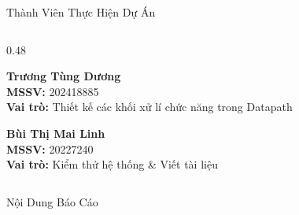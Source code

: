 \documentclass[10pt, aspectratio=169]{beamer}
\begin{document}
\begin{frame}{Thành Viên Thực Hiện Dự Án}
\begin{columns}[T]
    \begin{column}{0.48\textwidth}
      \centering
      \begin{minipage}{\textwidth}
        \centering
        \colorbox{DeepBlue!5}{
          \begin{minipage}[t][2.2cm][c]{0.95\textwidth}
            \centering
            \vspace{0.15cm}
            {\large\bfseries\color{DeepBlue} Trương Tùng Dương} \\
            \vspace{0.15cm}
            \scriptsize
            \textbf{MSSV:} 202418885 \\
            \textbf{Vai trò:} Thiết kế các khối xử lí chức năng trong Datapath
          \end{minipage}
        }
      \end{minipage}

      \vspace{0.5cm}

      \begin{minipage}{\textwidth}
        \centering
        \colorbox{DeepBlue!5}{
          \begin{minipage}[t][2.2cm][c]{0.95\textwidth}
            \centering
            \vspace{0.15cm}
            {\large\bfseries\color{DeepBlue} Bùi Thị Mai Linh} \\
            \vspace{0.15cm}
            \scriptsize
            \textbf{MSSV:} 20227240 \\
            \textbf{Vai trò:} Kiểm thử hệ thống \& Viết tài liệu
          \end{minipage}
        }
      \end{minipage}
    \end{column}
  \end{columns}
\end{frame}

\begin{frame}{Nội Dung Báo Cáo}
  \tableofcontents[subsubsectionstyle=hide]
\end{frame}




\end{document}
